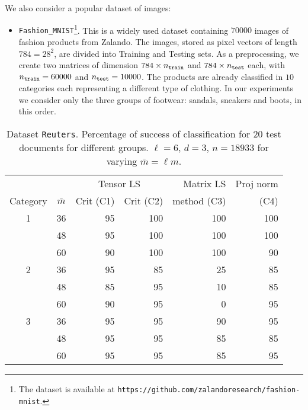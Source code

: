 \documentclass{siamart190516}
\begin{document}
We also consider a popular dataset of images:

\vskip 0.1in 
\begin{itemize}
\item {\tt Fashion\_MNIST}\footnote{The dataset is available at {\tt https://github.com/zalandoresearch/fashion-mnist}.}. This is a widely used dataset containing $70000$ images of fashion products from Zalando. The images, stored as pixel vectors of length $784=28^2$, 
are divided into Training and Testing sets. As a preprocessing, we create two matrices of dimension $784\times n_{\tt train}$ and $784\times n_{\tt test}$ each, with $n_{\tt train} = 60000$ and $n_{\tt test} = 10000$. The products are already classified in $10$ categories each representing a different type of clothing. In our experiments we consider only the three groups of footwear: sandals, sneakers and boots, in this order.


\end{itemize}
\vskip 0.1in



\begin{table}
\centering
\begin{tabular}{|c|c|rr|r|r|}
\hline
 &  &  \multicolumn{2}{c|}{Tensor LS} & Matrix LS  & Proj norm\\
Category & $\bar m$ &   Crit (C1) & Crit (C2) & method (C3) &  (C4)\\
\hline
1 & 36 &  95 &100 & 100 & 100 \\
  & 48 &  95 &100 & 100 & 100\\
  & 60 & 90  &100 & 100 & 90 \\
\hline
2 & 36 &95 & 85 &25 & 85 \\
  & 48 & 85 & 95  & 10 & 85 \\
  & 60 & 90 & 95  &  0 & 95  \\
  \hline
3 & 36 &95 & 95 &90 & 95\\
  & 48 &95 & 95  &  85 & 85 \\
  & 60 &95  & 95   & 85 & 95   \\
  \hline
    \end{tabular}
    \caption{Dataset {\tt Reuters}. Percentage of success of classification for 20 test documents for different groups.  $\ell=6$, $d=3$, $n=18933$ for varying $\bar m=\ell m$.\label{tab:reuters}}
\end{table}
\end{document}
